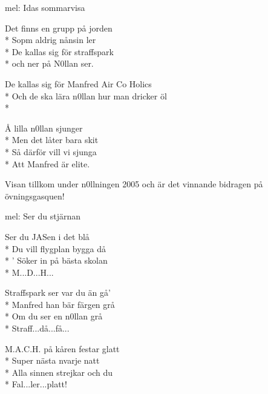 \begin{SongText}
    \begin{SongInfo}
        mel: Idas sommarvisa
    \end{SongInfo}
    \begin{SongVerse}
        Det finns en grupp på jorden\\*%
        Sopm aldrig nånsin ler\\*%
        De kallas sig för straffspark\\*%
        och ner på N0llan ser.
    \end{SongVerse}
    \begin{SongVerse}
        De kallas sig för Manfred Air Co Holics\\*%
        Och de ska lära n0llan hur man dricker öl\\*%
    \end{SongVerse}
    \begin{SongVerse}
        Å lilla n0llan sjunger\\*%
        Men det låter bara skit\\*%
        Så därför vill vi sjunga\\*%
        Att Manfred är elite.
    \end{SongVerse}
    \begin{SongInfo}
        Visan tillkom under n0llningen 2005 och är det vinnande bidragen på övningsgasquen!
    \end{SongInfo}
\end{SongText}

\begin{SongText}
    \begin{SongInfo}
        mel: Ser du stjärnan
    \end{SongInfo}
    \begin{SongVerse}
        Ser du JASen i det blå\\*%
        Du vill flygplan bygga då\\*%
        ' Söker in på bästa skolan\\*%
        M...D...H...
    \end{SongVerse}
    \begin{SongVerse}
        Straffspark ser var du än gå'\\*%
        Manfred han bär färgen grå\\*%
        Om du ser en n0llan grå\\*%
        Straff...då...få...
    \end{SongVerse}
    \begin{SongVerse}
        M.A.C.H. på kåren festar glatt\\*%
        Super nästa nvarje natt\\*%
        Alla sinnen strejkar och du\\*%
        Fal...ler...platt!
    \end{SongVerse}
\end{SongText}

